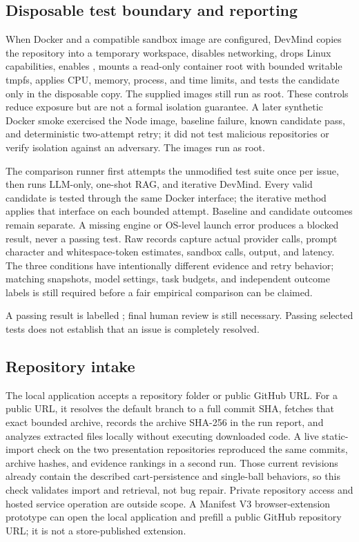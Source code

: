 \documentclass[3p,times,procedia]{elsarticle}
\begin{document}
\subsection{Disposable test boundary and reporting}
When Docker and a compatible sandbox image are configured, DevMind copies the repository into a temporary workspace, disables networking, drops Linux capabilities, enables \texttt{}, mounts a read-only container root with bounded writable tmpfs, applies CPU, memory, process, and time limits, and tests the candidate only in the disposable copy. The supplied images still run as root. These controls reduce exposure but are not a formal isolation guarantee. A later synthetic Docker smoke exercised the Node image, baseline failure, known candidate pass, and deterministic two-attempt retry; it did not test malicious repositories or verify isolation against an adversary. The images run as root.

The comparison runner first attempts the unmodified test suite once per issue, then runs LLM-only, one-shot RAG, and iterative DevMind. Every valid candidate is tested through the same Docker interface; the iterative method applies that interface on each bounded attempt. Baseline and candidate outcomes remain separate. A missing engine or OS-level launch error produces a blocked result, never a passing test. Raw records capture actual provider calls, prompt character and whitespace-token estimates, sandbox calls, output, and latency. The three conditions have intentionally different evidence and retry behavior; matching snapshots, model settings, task budgets, and independent outcome labels is still required before a fair empirical comparison can be claimed.

A passing result is labelled \texttt{}; final human review is still necessary. Passing selected tests does not establish that an issue is completely resolved.

\subsection{Repository intake}
The local application accepts a repository folder or public GitHub URL. For a public URL, it resolves the default branch to a full commit SHA, fetches that exact bounded archive, records the archive SHA-256 in the run report, and analyzes extracted files locally without executing downloaded code. A live static-import check on the two presentation repositories reproduced the same commits, archive hashes, and evidence rankings in a second run. Those current revisions already contain the described cart-persistence and single-ball behaviors, so this check validates import and retrieval, not bug repair. Private repository access and hosted service operation are outside scope. A Manifest V3 browser-extension prototype can open the local application and prefill a public GitHub repository URL; it is not a store-published extension.
\end{document}
